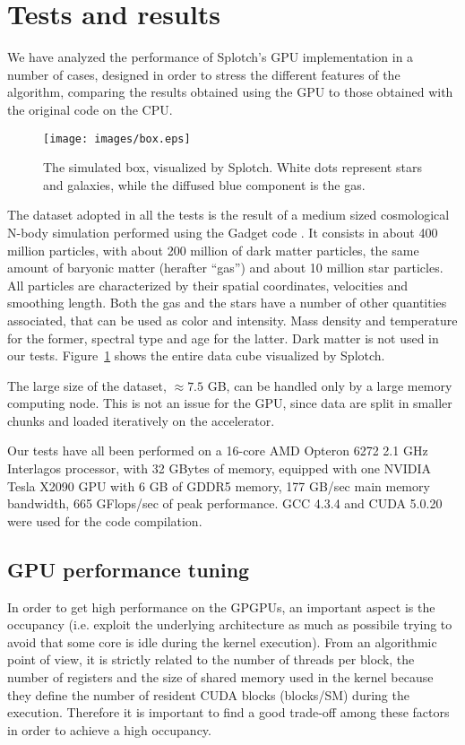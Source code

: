 \documentclass[1p]{elsarticle}
\begin{document}
\section{Tests and results}
\label{sec:results}
We have analyzed the performance of Splotch's GPU implementation in a number of cases, designed in 
order to stress the different features of the algorithm, 
comparing the results 
obtained using the GPU to those obtained with the original code on the CPU. 

\begin{figure}
\centering
\texttt{[image: images/box.eps]}
\caption{The simulated box, visualized by Splotch. White dots represent stars and galaxies, while the 
diffused blue component is the gas.}
\label{fig:box}
\end{figure}

The dataset adopted in all the tests is the result of a medium sized cosmological 
N-body simulation performed using the Gadget code \cite{gadgeturl}. It consists in about 
400 million particles, with about 200 million of dark matter particles, the same amount 
of baryonic matter (herafter ``gas'') and about 10 million star particles. 
All particles are characterized by their spatial coordinates, velocities
and smoothing length. 
Both the gas and the stars have a number of other quantities associated, that can be used 
as color and intensity. Mass density and temperature for the former, spectral type and age
for the latter. Dark matter is not used in our tests. Figure~\ref{fig:box} shows 
the entire data cube visualized by Splotch.

The large size of the dataset, $\approx 7.5$ GB, can be handled only by a large memory computing node. 
This is not an issue for the GPU, since data are split 
in smaller chunks and loaded iteratively on the accelerator. 

Our tests have all been performed on a 16-core AMD Opteron 6272 2.1 GHz Interlagos processor,
with 32 GBytes of memory, equipped with one NVIDIA Tesla X2090 GPU with 6 GB of GDDR5 memory,
177 GB/sec 
main memory bandwidth, 665 GFlops/sec of peak performance. GCC 4.3.4 and CUDA 5.0.20 
were used for the code compilation.

\subsection{GPU performance tuning}
\label{sec:gpuperf}
In order to get high performance on the GPGPUs, an important aspect is the occupancy (i.e. exploit the underlying architecture as much as possibile trying to avoid that some core is idle during the kernel execution).
From an algorithmic point of view, it is strictly related to the number of threads per block, the number of registers and the size of shared memory used in the kernel because they define the number of resident CUDA blocks (blocks/SM) during the execution. 
Therefore it is important to find a good trade-off among these factors in order to achieve a high occupancy. 
\end{document}
